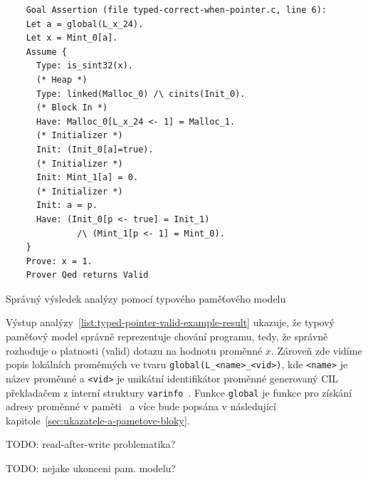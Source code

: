 \begin{listing}[H]
    \begin{verbatim}
    Goal Assertion (file typed-correct-when-pointer.c, line 6):
    Let a = global(L_x_24).
    Let x = Mint_0[a].
    Assume {
      Type: is_sint32(x).
      (* Heap *)
      Type: linked(Malloc_0) /\ cinits(Init_0).
      (* Block In *)
      Have: Malloc_0[L_x_24 <- 1] = Malloc_1.
      (* Initializer *)
      Init: (Init_0[a]=true).
      (* Initializer *)
      Init: Mint_1[a] = 0.
      (* Initializer *)
      Init: a = p.
      Have: (Init_0[p <- true] = Init_1)
              /\ (Mint_1[p <- 1] = Mint_0).
    }
    Prove: x = 1.
    Prover Qed returns Valid
    \end{verbatim}
    \caption{Správný výsledek analýzy pomocí typového paměťového modelu}
    \label{list:typed-pointer-valid-example-result}
\end{listing}

Výstup analýzy~\ref{list:typed-pointer-valid-example-result} ukazuje,
že typový paměťový model správně reprezentuje chování programu,
tedy, že správně rozhoduje o platnosti (valid) dotazu na hodnotu proměnné $x$.
Zároveň zde vidíme popis lokálních proměnných ve tvaru \texttt{global(L\_<name>\_<vid>)},
kde \texttt{<name>} je název proměnné a \texttt{<vid>} je unikátní identifikátor proměnné
generovaný CIL překladačem z interní struktury \texttt{varinfo}~\cite{FCPluginDevSignoles2024}.
Funkce \texttt{global} je funkce pro získání adresy proměnné v paměti~\cite{BlanchardWP2024}
a více bude popsána v následující kapitole~\ref{sec:ukazatele-a-pametove-bloky}.

TODO: read-after-write problematika?

TODO: nejake ukonceni pam. modelu?




